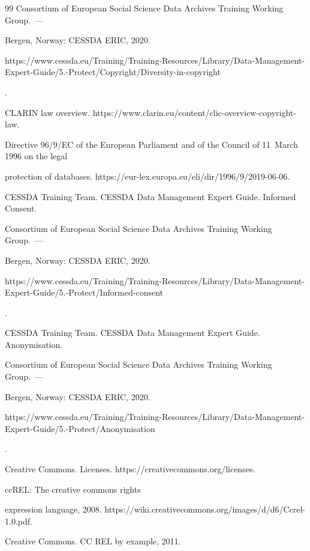 {{\begin{thebibliography}{99}
Consortium of European Social Science Data Archives Training Working Group.~--- 

Bergen, Norway: \mbox{CESSDA} ERIC, 2020. {\sf  

https://www.cessda.eu/Training/Training-Resources/Library/Data-Management-Expert-Guide/5.-Protect/Copyright/Diversity-in-copyright}.


CLARIN law overview. {\sf https://www.clarin.eu/content/clic-overview-copyright-law}.


Directive 96/9/EC of the European Parliament and of the Council of 11~March 1996 on the legal 

protection of databases. {\sf https://eur-lex.europa.eu/eli/dir/1996/9/2019-06-06}.


CESSDA Training Team. CESSDA Data Management Expert Guide. Informed Consent. 

Consortium of European Social Science Data Archives Training Working Group.~--- 

Bergen, Norway: CESSDA ERIC, 2020. {\sf  

https://www.\linebreak  cessda.eu/Training/Training-Resources/Library/Data-Management-Expert-Guide/5.-Protect/Informed-consent}.


CESSDA Training Team. CESSDA Data Management Expert Guide. Anonymisation. 

Consortium of European Social Science Data Archives Training Working Group.~--- 

Bergen, Norway: CESSDA ERIC, 2020. {\sf  

https://www.cessda.eu/Training/Training-Resources/Library/Data-Management-Expert-Guide/5.-Protect/Anonymisation}.


Creative Commons.  Licenses.  {\sf https://creativecommons.org/licenses}.


 ccREL: The creative commons rights 

expression language, 2008. {\sf https://wiki.creativecommons.org/images/d/d6/Ccrel-1.0.pdf}.


Creative Commons. CC REL by example, 2011. {\sf  

}
\end{thebibliography}}}
